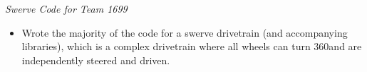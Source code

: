 \documentclass[line,margin]{res}
\begin{document}
\begin{resume}
	{\sl Swerve Code for Team 1699}
		\begin{itemize} 
			\itemsep 0pt
			\item Wrote the majority of the code for a swerve drivetrain (and accompanying libraries), which is a complex drivetrain where all wheels can turn 360\textdegree and are independently steered and driven.
		\end{itemize}



\end{resume}
\end{document}
